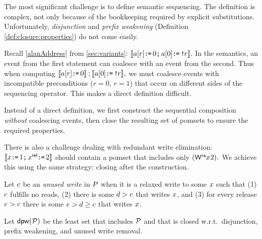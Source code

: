 The most significant challenge is to define semantic sequencing.  The
definition is complex, not only because of the bookkeeping required by
explicit substitutions.  Unfortunately, \emph{disjunction} and \emph{prefix
  weakening} (Definition \ref{def:closure:properties}) do not come easily.

Recall \eqref{alanAddress} from \textsection\ref{sec:variants}:
\begin{math}
  \llbracket a[r] \texttt{:}\mkern-1mu\texttt{=}\, 0\texttt{;}\,\allowbreak a[0]\texttt{:}\mkern-1mu\texttt{=}\, \texttt{!}\mkern-1mu r\rrbracket.
\end{math}
In the semantics, an event from the first statement can coalesce with an
event from the second.  Thus when computing
\begin{math}
  \llbracket a[r] \texttt{:}\mkern-1mu\texttt{=}\, 0\rrbracket \mathbin; \llbracket a[0]\texttt{:}\mkern-1mu\texttt{=}\, \texttt{!}\mkern-1mu r\rrbracket,
\end{math}
we must coalesce events with incompatible preconditions ($r{=}0$, $r{=}1$)
that occur on different sides of the sequencing operator.  This makes a
direct definition difficult.

Instead of a direct definition, we first construct the sequential composition
\emph{without} coalescing events, then close the resulting set of pomsets to
ensure the required properties.

There is also a challenge dealing with redundant write elimination:
\begin{math}
  \llbracket x\texttt{:}\mkern-1mu\texttt{=}\, 1\texttt{;}\,\allowbreak x^{\mathsf{rel}}\texttt{:}\mkern-1mu\texttt{=}\, 2\rrbracket 
\end{math}
should contain a pomset that includes only
\begin{math}
  (\DW[\modeRA]{x}{2}).
\end{math}
We achieve this using the same strategy: closing after the construction.

Let $c$ be an \emph{unused write} in $P$ when it is a relaxed write to
some $x$ such that (1) $c$ fulfills no reads, (2) there is some
$d>c$ that writes $x$, and (3) for every release $e>c$
there is some $e>d\ge c$ that writes $x$.

Let $\mathsf{dpw}(\mathcal{P})$ be the least set that
includes $\mathcal{P}$ and that is closed w.r.t.~disjunction, prefix weakening, and
unused write removal.


